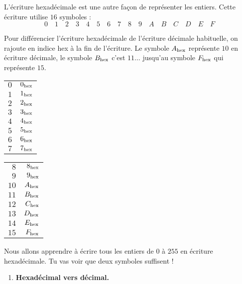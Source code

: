 \documentclass[class=report,crop=false, 12pt]{standalone}
\begin{document}
\begin{activite}[Hexadécimal]

L'écriture hexadécimale est une autre façon de représenter les entiers. Cette écriture utilise $16$ symboles :
$$0 \quad 1 \quad 2 \quad 3 \quad 4 \quad 5 \quad 6 \quad 7 \quad 8 \quad 9 \quad 
A \quad B \quad C \quad D \quad E \quad F$$

Pour différencier l'écriture hexadécimale de l'écriture décimale habituelle, on rajoute en indice \og hex \fg{} à la fin de l'écriture.
Le symbole $A_{\text{hex}}$ représente $10$ en écriture décimale, le symbole $B_{\text{hex}}$ c'est $11\ldots$ jusqu'au symbole $F_{\text{hex}}$ qui représente $15$.

  \begin{center}
    \begin{tabular}[ht]{r|r}
       
      $0$ & $0_{\text{hex}}$\\
      $1$ & $1_{\text{hex}}$\\
      $2$ & $2_{\text{hex}}$\\
      $3$ & $3_{\text{hex}}$\\
      $4$ & $4_{\text{hex}}$\\
      $5$ & $5_{\text{hex}}$\\
      $6$ & $6_{\text{hex}}$\\
      $7$ & $7_{\text{hex}}$\\

    \end{tabular}\qquad\qquad
    \begin{tabular}[ht]{r|r}
    
      $8$ & $8_{\text{hex}}$\\
      $9$  & $9_{\text{hex}}$\\
      $10$ & $A_{\text{hex}}$\\
      $11$ & $B_{\text{hex}}$\\
      $12$ & $C_{\text{hex}}$\\
      $13$ & $D_{\text{hex}}$\\
      $14$ & $E_{\text{hex}}$\\
      $15$ & $F_{\text{hex}}$\\    
    
    \end{tabular}
  \end{center}


Nous allons apprendre à écrire tous les entiers de $0$ à $255$ en écriture hexadécimale.
Tu vas voir que deux symboles suffisent !

\begin{enumerate}
  \item \textbf{Hexadécimal vers décimal.}
  

\end{enumerate}
\end{activite}
\end{document}
